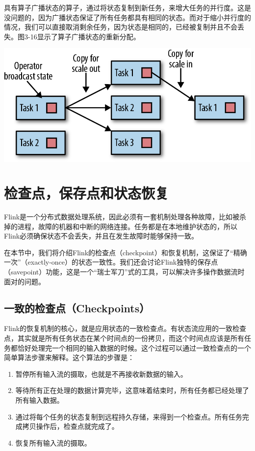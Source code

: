 \documentclass[oneside]{ctexbook}
\begin{document}
具有算子广播状态的算子，通过将状态复制到新任务，来增大任务的并行度。这是没问题的，因为广播状态保证了所有任务都具有相同的状态。而对于缩小并行度的情况，我们可以直接取消剩余任务，因为状态是相同的，已经被复制并且不会丢失。图3-16显示了算子广播状态的重新分配。

\noindent \includegraphics[width=\textwidth]{spaf_0316.png}

\section{检查点，保存点和状态恢复}

Flink是一个分布式数据处理系统，因此必须有一套机制处理各种故障，比如被杀掉的进程，故障的机器和中断的网络连接。任务都是在本地维护状态的，所以Flink必须确保状态不会丢失，并且在发生故障时能够保持一致。

在本节中，我们将介绍Flink的检查点（checkpoint）和恢复机制，这保证了“精确一次”（exactly-once）的状态一致性。我们还会讨论Flink独特的保存点（savepoint）功能，这是一个“瑞士军刀”式的工具，可以解决许多操作数据流时面对的问题。

\subsection{一致的检查点（Checkpoints）}

Flink的恢复机制的核心，就是应用状态的一致检查点。有状态流应用的一致检查点，其实就是所有任务状态在某个时间点的一份拷贝，而这个时间点应该是所有任务都恰好处理完一个相同的输入数据的时候。这个过程可以通过一致检查点的一个简单算法步骤来解释。这个算法的步骤是：

\begin{enumerate}
  \item 暂停所有输入流的摄取，也就是不再接收新数据的输入。
  \item 等待所有正在处理的数据计算完毕，这意味着结束时，所有任务都已经处理了所有输入数据。
  \item 通过将每个任务的状态复制到远程持久存储，来得到一个检查点。所有任务完成拷贝操作后，检查点就完成了。
  \item 恢复所有输入流的摄取。
\end{enumerate}
\end{document}
